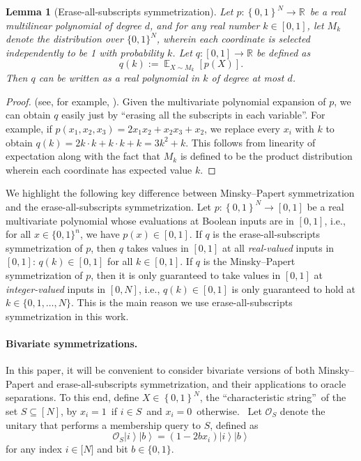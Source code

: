 \documentclass[10pt,a4paper]{article}
\newtheorem{lemma}[theorem]{Lemma}
\newcommand{\<}{\langle}
\renewcommand{\>}{\rangle}
\DeclareMathOperator{\E}{\mathbb E}
\newcommand{\para}[1]{\paragraph{#1}}
\begin{document}
\begin{lemma}[Erase-all-subscripts
symmetrization]
Let $p:\left\{ 0,1\right\} ^{N}\rightarrow\mathbb{R}$\ be a
real multilinear polynomial of degree $d$,
and for
any real number $k \in [0, 1]$,
let $M_{k}$ denote
the distribution over $\{0, 1\}^N$, wherein each coordinate is selected
independently to be 1 with probability $k$.
Let $q:[0, 1] \to
\mathbb{R}$ be defined as
\begin{equation}
q\left( k\right) :=\E_{X \sim M_{k}}\left[ p\left( X\right) 
\right] .
\end{equation}
Then $q$ can be written as a real polynomial in $k$ of degree at most $d$.
\label{lem:eraseallsubscripts}
\end{lemma}
\begin{proof} (see, for example, \cite[Proof of Theorem 3]{STT12}).
Given the multivariate polynomial expansion of $p$,
we can obtain $q$ easily just by ``erasing all the subscripts in each variable''. For example, if
$p(x_1, x_2, x_3)= 2 x_1 x_2 + x_2 x_3 + x_2$, we replace every $x_i$ with $k$ to obtain
$q(k)=2k\cdot k+ k\cdot k + k=3k^2 + k$.
This follows from linearity of expectation along with the fact that $M_k$
is defined to be the
product distribution wherein
each coordinate has expected value $k$.
\end{proof}

We highlight the following key difference between Minsky--Papert symmetrization
and the erase-all-subscripts symmetrization. Let $p:\left\{ 0,1\right\} ^{N}\rightarrow [0, 1]$
be a real multivariate polynomial whose evaluations at Boolean inputs are in
$[0, 1]$, i.e., for all $x\in\{0,1\}^n$, we have $p(x)\in[0,1]$.
If $q$ is the erase-all-subscripts symmetrization of $p$, 
then $q$ takes values in $[0,1]$ at all \emph{real-valued}
inputs in $[0, 1]$: $q(k) \in [0,1]$ for all $k \in [0,1]$. 
If $q$ is the Minsky--Papert symmetrization of $p$,
then it is only guaranteed to take values in $[0,1]$ at 
\emph{integer-valued} inputs in $[0, N]$, i.e., $q(k)\in [0,1]$ 
is only guaranteed to hold at $k\in\{0,1,\ldots,N\}$.
This is the main reason we use erase-all-subscripts symmetrization
in this work.

\para{Bivariate symmetrizations.}
In this paper, it will be convenient
to consider bivariate versions of both
Minsky--Papert and erase-all-subscripts
symmetrization, and their applications to oracle separations. To this end,
define $X\in \left\{ 0,1\right\} ^{N}$, the \textquotedblleft characteristic
string\textquotedblright\ of the set $S\subseteq \left[ N\right] $, by $
x_{i}=1$\ if $i\in S$\ and $x_{i}=0$\ otherwise. \ Let $\mathcal{O}_{S}$
denote the unitary that performs a membership query to $S$, defined as
\begin{equation}
\mathcal{O}_{S}\left\vert i\right\rangle \left\vert b\right\rangle
=(1-2bx_{i})\left\vert i\right\rangle \left\vert b\right\rangle
\end{equation}
for any index $i\in \lbrack N]$ and bit $b\in \{0,1\}$.
\end{document}
